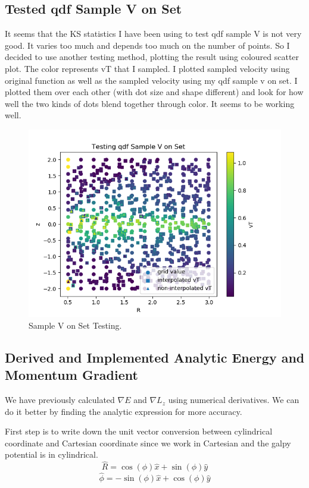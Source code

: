 \documentclass[12pt]{article}
\begin{document}
\subsection{Tested qdf Sample V on Set}
It seems that the KS statistics I have been using to test qdf sample V is not very good. It varies too much and depends too much on the number of points. So I decided to use another testing method, plotting the result using coloured scatter plot. The color represents vT that I sampled. I plotted sampled velocity using original function as well as the sampled velocity using my qdf sample v on set. I plotted them over each other (with dot size and shape different) and look for how well the two kinds of dots blend together through color. It seems to be working well.
\begin{figure}
  \includegraphics{sample v on set vs usual.png}
  \caption{Sample V on Set Testing.}
  \label{fig:sampleV}
\end{figure}

\newpage
\subsection{Derived and Implemented Analytic Energy and Momentum Gradient}
We have previously calculated $\nabla E$ and $\nabla L_z$ using numerical derivatives. We can do it better by finding the analytic expression for more accuracy.

First step is to write down the unit vector conversion between cylindrical coordinate and Cartesian coordinate since we work in Cartesian and the galpy potential is in cylindrical.
$$ \hat{R} = \cos(\phi) \hat{x} + \sin(\phi) \hat{y} $$
$$ \hat{\phi} = - \sin(\phi) \hat{x} + \cos(\phi) \hat{y} $$
\end{document}
